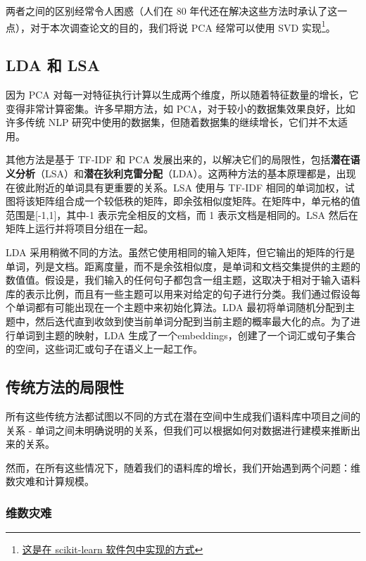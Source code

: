 \documentclass[Chinese, 11pt, table]{diazessay} %
\begin{document}
\begin{CJK}{UTF8}{gbsn}
\begin{sloppypar}
两者之间的区别经常令人困惑（人们在 80 年代还在解决这些方法时承认了这一点\cite{gerbrands1981relationships}），对于本次调查论文的目的，我们将说 PCA 经常可以使用 SVD 实现\footnote{\href{https://scikit-learn.org/stable/modules/generated/sklearn.decomposition.PCA.html}{这是在 scikit-learn 软件包中实现的方式}}。

\subsection{LDA 和 LSA}

因为 PCA 对每一对特征执行计算以生成两个维度，所以随着特征数量的增长，它变得非常计算密集。许多早期方法，如 PCA，对于较小的数据集效果良好，比如许多传统 NLP 研究中使用的数据集，但随着数据集的继续增长，它们并不太适用。

其他方法是基于 TF-IDF 和 PCA 发展出来的，以解决它们的局限性，包括\textbf{潜在语义分析}（LSA）和\textbf{潜在狄利克雷分配}（LDA）\cite{cvitanic2016lda}。这两种方法的基本原理都是，出现在彼此附近的单词具有更重要的关系。LSA 使用与 TF-IDF 相同的单词加权，试图将该矩阵组合成一个较低秩的矩阵，即余弦相似度矩阵。在矩阵中，单元格的值范围是[-1,1]，其中-1 表示完全相反的文档，而 1 表示文档是相同的。LSA 然后在矩阵上运行并将项目分组在一起。

LDA 采用稍微不同的方法。虽然它使用相同的输入矩阵，但它输出的矩阵的行是单词，列是文档。距离度量，而不是余弦相似度，是单词和文档交集提供的主题的数值值。假设是，我们输入的任何句子都包含一组主题，这取决于相对于输入语料库的表示比例，而且有一些主题可以用来对给定的句子进行分类。我们通过假设每个单词都有可能出现在一个主题中来初始化算法。LDA 最初将单词随机分配到主题中，然后迭代直到收敛到使当前单词分配到当前主题的概率最大化的点。为了进行单词到主题的映射，LDA 生成了一个embeddings，创建了一个词汇或句子集合的空间，这些词汇或句子在语义上一起工作。

\subsection{传统方法的局限性}

所有这些传统方法都试图以不同的方式在潜在空间中生成我们语料库中项目之间的关系 - 单词之间未明确说明的关系，但我们可以根据如何对数据进行建模来推断出来的关系。

然而，在所有这些情况下，随着我们的语料库的增长，我们开始遇到两个问题：维数灾难和计算规模。

\subsubsection{维数灾难}


\end{sloppypar}
\end{CJK}
\end{document}
